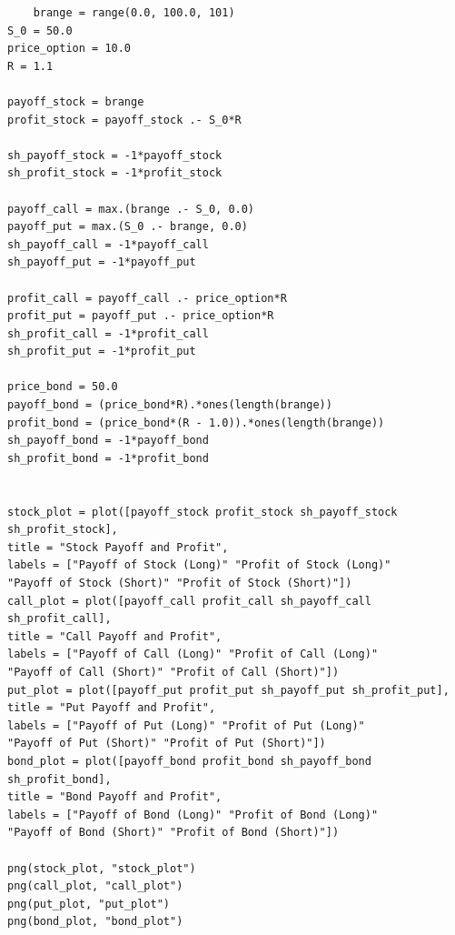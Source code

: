 \documentclass[12pt, letterpaper]{article}
\begin{document}
    \begin{verbatim}
    brange = range(0.0, 100.0, 101)
S_0 = 50.0
price_option = 10.0
R = 1.1

payoff_stock = brange
profit_stock = payoff_stock .- S_0*R

sh_payoff_stock = -1*payoff_stock
sh_profit_stock = -1*profit_stock

payoff_call = max.(brange .- S_0, 0.0)
payoff_put = max.(S_0 .- brange, 0.0)
sh_payoff_call = -1*payoff_call
sh_payoff_put = -1*payoff_put

profit_call = payoff_call .- price_option*R
profit_put = payoff_put .- price_option*R 
sh_profit_call = -1*profit_call 
sh_profit_put = -1*profit_put 

price_bond = 50.0
payoff_bond = (price_bond*R).*ones(length(brange))
profit_bond = (price_bond*(R - 1.0)).*ones(length(brange))
sh_payoff_bond = -1*payoff_bond
sh_profit_bond = -1*profit_bond


stock_plot = plot([payoff_stock profit_stock sh_payoff_stock sh_profit_stock], 
title = "Stock Payoff and Profit", 
labels = ["Payoff of Stock (Long)" "Profit of Stock (Long)" 
"Payoff of Stock (Short)" "Profit of Stock (Short)"])
call_plot = plot([payoff_call profit_call sh_payoff_call sh_profit_call], 
title = "Call Payoff and Profit", 
labels = ["Payoff of Call (Long)" "Profit of Call (Long)" 
"Payoff of Call (Short)" "Profit of Call (Short)"])
put_plot = plot([payoff_put profit_put sh_payoff_put sh_profit_put], 
title = "Put Payoff and Profit", 
labels = ["Payoff of Put (Long)" "Profit of Put (Long)" 
"Payoff of Put (Short)" "Profit of Put (Short)"])
bond_plot = plot([payoff_bond profit_bond sh_payoff_bond sh_profit_bond], 
title = "Bond Payoff and Profit", 
labels = ["Payoff of Bond (Long)" "Profit of Bond (Long)" 
"Payoff of Bond (Short)" "Profit of Bond (Short)"])

png(stock_plot, "stock_plot")
png(call_plot, "call_plot")
png(put_plot, "put_plot")
png(bond_plot, "bond_plot")
    \end{verbatim}
\end{document}
